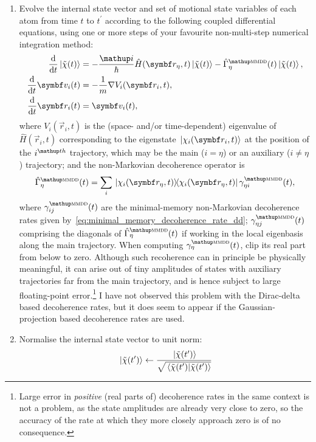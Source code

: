 \begin{enumerate}
    \item Evolve the internal state vector and set of motional state variables of each atom from time $t$ to $t^\prime$ according to the following coupled differential equations, using one or more steps of your favourite non-multi-step numerical integration method:
    \begin{align}
    \dv{t}\ket{\tilde\chi(t)} &= -\frac\ii\hbar \hat H(\vec r_\eta, t)\ket{\tilde\chi(t)} - \hat\Gamma^\up{\textsc{mmdd}}_\eta(t)\ket{\tilde\chi(t)},\\
    \dv{t}\vec v_i(t) &= -\frac1m\nabla V_i(\vec r_i, t),\\
    \dv{t}\vec r_i(t) &= \vec v_i(t),
    \end{align}
    where $V_i(\vec r_i, t)$ is the (space- and/or time-dependent) eigenvalue of $\hat H(\vec r_i, t)$ corresponding to the eigenstate $\ket{\chi_i(\vec r_i, t)}$ at the position of the $i^\up{th}$ trajectory, which may be the main ($i=\eta$) or an auxiliary ($i\neq\eta$) trajectory; and the non-Markovian decoherence operator is
    \begin{align}
    \hat\Gamma^\up{\textsc{mmdd}}_\eta(t) = \sum_i\ketbra{\chi_i(\vec r_\eta, t)}{\chi_i(\vec r_\eta, t)}\gamma^\up{\textsc{mmdd}}_{\eta i}(t),
    \end{align}
    where $\gamma^\up{\textsc{mmdd}}_{ij}(t)$ are the minimal-memory non-Markovian decoherence rates given by~\eqref{eq:minimal_memory_decoherence_rate_dd}; $\gamma^\up{\textsc{mmdd}}_{\eta j}(t)$ comprising the diagonals of $\hat\Gamma^\up{\textsc{mmdd}}_\eta(t)$ if working in the local eigenbasis along the main trajectory. When computing $\gamma^\up{\textsc{mmdd}}_\eta(t)$, clip its real part from below to zero. Although such recoherence can in principle be physically meaningful, it can arise out of tiny amplitudes of states with auxiliary trajectories far from the main trajectory, and is hence subject to large floating-point error.\footnote{Large error in \emph{positive} (real parts of) decoherence rates in the same context is not a problem, as the state amplitudes are already very close to zero, so the accuracy of the rate at which they more closely approach zero is of no consequence.} I have not observed this problem with the Dirac-delta based decoherence rates, but it does seem to appear if the Gaussian-projection based decoherence rates are used.

    \item Normalise the internal state vector to unit norm:
    \begin{align}
    \ket{\tilde\chi(t^\prime)} \leftarrow \frac{\ket{\tilde\chi(t^\prime)}}
                               {\sqrt{\braket{\tilde\chi(t^\prime)}{\tilde\chi(t^\prime)}}}
    \end{align}


\end{enumerate}
